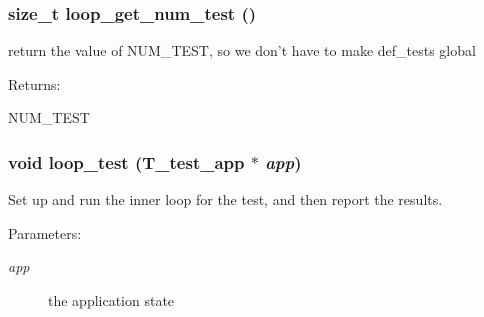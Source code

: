 \subsubsection{\setlength{\rightskip}{0pt plus 5cm}size\_\-t loop\_\-get\_\-num\_\-test ()}\label{loop__test_8h_a1}


return the value of NUM\_\-TEST, so we don't have to make def\_\-tests global

\begin{Desc}
\item[Returns: ]\par
NUM\_\-TEST \end{Desc}
\subsubsection{\setlength{\rightskip}{0pt plus 5cm}void loop\_\-test ({\bf T\_\-test\_\-app} $\ast$ {\em app})}\label{loop__test_8h_a0}


Set up and run the inner loop for the test, and then report the results.

\begin{Desc}
\item[Parameters: ]\par
\begin{description}
\item[{\em 
app}]the application state \end{description}
\end{Desc}
